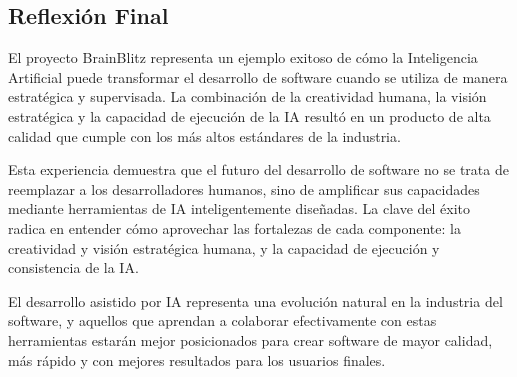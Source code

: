 \documentclass[12pt,a4paper]{article}
\begin{document}
\subsection{Reflexión Final}

El proyecto BrainBlitz representa un ejemplo exitoso de cómo la Inteligencia Artificial puede transformar el desarrollo de software cuando se utiliza de manera estratégica y supervisada. La combinación de la creatividad humana, la visión estratégica y la capacidad de ejecución de la IA resultó en un producto de alta calidad que cumple con los más altos estándares de la industria.

Esta experiencia demuestra que el futuro del desarrollo de software no se trata de reemplazar a los desarrolladores humanos, sino de amplificar sus capacidades mediante herramientas de IA inteligentemente diseñadas. La clave del éxito radica en entender cómo aprovechar las fortalezas de cada componente: la creatividad y visión estratégica humana, y la capacidad de ejecución y consistencia de la IA.

El desarrollo asistido por IA representa una evolución natural en la industria del software, y aquellos que aprendan a colaborar efectivamente con estas herramientas estarán mejor posicionados para crear software de mayor calidad, más rápido y con mejores resultados para los usuarios finales.
\end{document}
